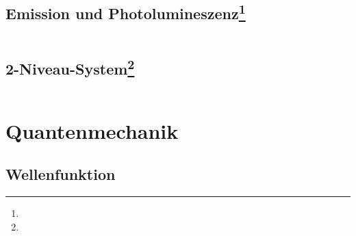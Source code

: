\documentclass[12pt,a4paper]{article}
\renewcommand{\=}[1]{\stackrel{#1}{=}}
\theoremstyle{definition}
\theoremstyle{remark}
\begin{document}
\subsection[Emission und Photolumineszenz]{Emission und Photolumineszenz\let\thefootnote\relax\footnote{}}

\begin{minipage}[t]{.49\linewidth}
\vspace{0pt}
\noindent\begin{tabular}{ll}

\end{tabular}
\end{minipage}%
\begin{minipage}[t]{.49\linewidth}
\vspace{0pt}

\end{minipage}



\subsection[2-Niveau-System]{2-Niveau-System\let\thefootnote\relax\footnote{}}

\begin{minipage}[t]{.49\linewidth}
\vspace{0pt}
\noindent\begin{tabular}{ll}


\end{tabular}
\end{minipage}%
\begin{minipage}[t]{.49\linewidth}
\vspace{0pt}

\end{minipage}



\newpage
\section{Quantenmechanik}

\subsection{Wellenfunktion}
\end{document}
